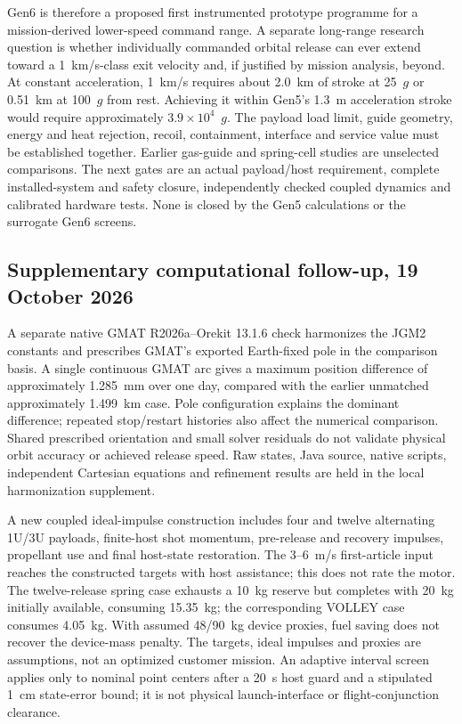\documentclass[conference]{IEEEtran}
\begin{document}
Gen6 is therefore a proposed first instrumented prototype programme for a mission-derived lower-speed command range. A separate long-range research question is whether individually commanded orbital release can ever extend toward a 1~km/s-class exit velocity and, if justified by mission analysis, beyond. At constant acceleration, 1~km/s requires about 2.0~km of stroke at 25~$g$ or 0.51~km at 100~$g$ from rest. Achieving it within Gen5's 1.3~m acceleration stroke would require approximately $3.9\times10^4$~$g$. The payload load limit, guide geometry, energy and heat rejection, recoil, containment, interface and service value must be established together. Earlier gas-guide and spring-cell studies are unselected comparisons. The next gates are an actual payload/host requirement, complete installed-system and safety closure, independently checked coupled dynamics and calibrated hardware tests. None is closed by the Gen5 calculations or the surrogate Gen6 screens.


\subsection{Supplementary computational follow-up, 19 October 2026}
A separate native GMAT R2026a--Orekit 13.1.6 check harmonizes the JGM2 constants and prescribes GMAT's exported Earth-fixed pole in the comparison basis. A single continuous GMAT arc gives a maximum position difference of approximately 1.285~mm over one day, compared with the earlier unmatched approximately 1.499~km case. Pole configuration explains the dominant difference; repeated stop/restart histories also affect the numerical comparison. Shared prescribed orientation and small solver residuals do not validate physical orbit accuracy or achieved release speed. Raw states, Java source, native scripts, independent Cartesian equations and refinement results are held in the local harmonization supplement.

A new coupled ideal-impulse construction includes four and twelve alternating 1U/3U payloads, finite-host shot momentum, pre-release and recovery impulses, propellant use and final host-state restoration. The 3--6~m/s first-article input reaches the constructed targets with host assistance; this does not rate the motor. The twelve-release spring case exhausts a 10~kg reserve but completes with 20~kg initially available, consuming 15.35~kg; the corresponding VOLLEY case consumes 4.05~kg. With assumed 48/90~kg device proxies, fuel saving does not recover the device-mass penalty. The targets, ideal impulses and proxies are assumptions, not an optimized customer mission. An adaptive interval screen applies only to nominal point centers after a 20~s host guard and a stipulated 1~cm state-error bound; it is not physical launch-interface or flight-conjunction clearance.
\end{document}
